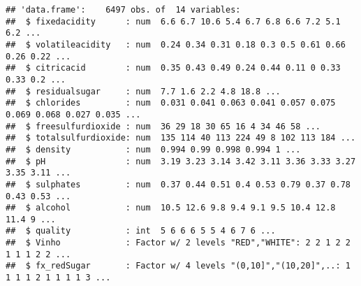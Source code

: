 \documentclass[]{article}
\newenvironment{Shaded}{\begin{snugshade}}{\end{snugshade}}
\newcommand{\KeywordTok}[1]{\textcolor[rgb]{0.13,0.29,0.53}{\textbf{#1}}}
\newcommand{\OperatorTok}[1]{\textcolor[rgb]{0.81,0.36,0.00}{\textbf{#1}}}
\newcommand{\NormalTok}[1]{#1}
\begin{document}
\begin{verbatim}
## 'data.frame':    6497 obs. of  14 variables:
##  $ fixedacidity      : num  6.6 6.7 10.6 5.4 6.7 6.8 6.6 7.2 5.1 6.2 ...
##  $ volatileacidity   : num  0.24 0.34 0.31 0.18 0.3 0.5 0.61 0.66 0.26 0.22 ...
##  $ citricacid        : num  0.35 0.43 0.49 0.24 0.44 0.11 0 0.33 0.33 0.2 ...
##  $ residualsugar     : num  7.7 1.6 2.2 4.8 18.8 ...
##  $ chlorides         : num  0.031 0.041 0.063 0.041 0.057 0.075 0.069 0.068 0.027 0.035 ...
##  $ freesulfurdioxide : num  36 29 18 30 65 16 4 34 46 58 ...
##  $ totalsulfurdioxide: num  135 114 40 113 224 49 8 102 113 184 ...
##  $ density           : num  0.994 0.99 0.998 0.994 1 ...
##  $ pH                : num  3.19 3.23 3.14 3.42 3.11 3.36 3.33 3.27 3.35 3.11 ...
##  $ sulphates         : num  0.37 0.44 0.51 0.4 0.53 0.79 0.37 0.78 0.43 0.53 ...
##  $ alcohol           : num  10.5 12.6 9.8 9.4 9.1 9.5 10.4 12.8 11.4 9 ...
##  $ quality           : int  5 6 6 6 5 5 4 6 7 6 ...
##  $ Vinho             : Factor w/ 2 levels "RED","WHITE": 2 2 1 2 2 1 1 1 2 2 ...
##  $ fx_redSugar       : Factor w/ 4 levels "(0,10]","(10,20]",..: 1 1 1 1 2 1 1 1 1 3 ...
\end{verbatim}

\begin{Shaded}
\end{Shaded}
\end{document}

